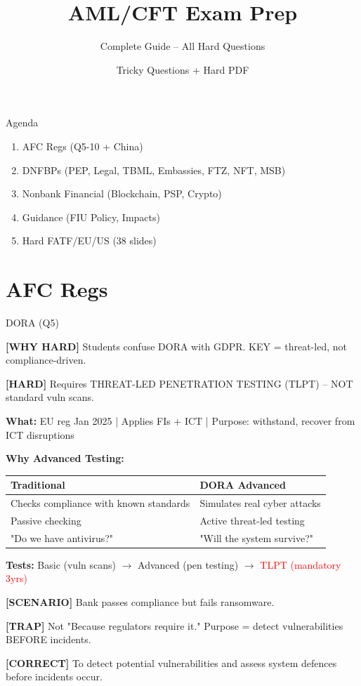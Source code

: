 \documentclass[6pt,aspectratio=169,fontsize=5pt]{beamer}
\renewcommand{\tiny}{\fontsize{3.5pt}{4.5pt}\selectfont}
\renewcommand{\footnotesize}{\fontsize{5.5pt}{6.5pt}\selectfont}
\renewcommand{\normalsize}{\fontsize{7.5pt}{8.5pt}\selectfont}
\renewcommand{\large}{\fontsize{8.5pt}{10pt}\selectfont}
\renewcommand{\LARGE}{\fontsize{12pt}{14pt}\selectfont}
\newcommand{\trap}[1]{%
	\begin{block}{\textcolor{redtrap}{\textbf{[TRAP]}}}
		\textcolor{redtrap}{\tiny #1}
	\end{block}
}
\newcommand{\scenario}[1]{%
	\begin{block}{\textbf{[SCENARIO]}}
		\tiny #1
	\end{block}
}
\newcommand{\correct}[1]{%
	\begin{block}{\textcolor{greencorrect}{\textbf{[CORRECT]}}}
		\textcolor{greencorrect}{\tiny #1}
	\end{block}
}
\newcommand{\hard}[1]{%
	\begin{block}{\textcolor{hardcolor}{\textbf{[HARD]}}}
		\textcolor{hardcolor}{\tiny #1}
	\end{block}
}
\newcommand{\hardexplain}[1]{%
	\begin{block}{\textcolor{orangehard}{\textbf{[WHY HARD]}}}
		\textcolor{orangehard}{\tiny #1}
	\end{block}
}
\begin{document}
	
	\begin{frame}
		\title{\LARGE AML/CFT Exam Prep}
		\subtitle{\large Complete Guide -- All Hard Questions}
		\author{\footnotesize Tricky Questions + Hard PDF}
		\date{}
		\titlepage
	\end{frame}
	
	\begin{frame}{\large Agenda}
		\begin{enumerate}
			\item AFC Regs (Q5-10 + China)
			\item DNFBPs (PEP, Legal, TBML, Embassies, FTZ, NFT, MSB)
			\item Nonbank Financial (Blockchain, PSP, Crypto)
			\item Guidance (FIU Policy, Impacts)
			\item Hard FATF/EU/US (38 slides)
		\end{enumerate}
	\end{frame}
	
	\section{AFC Regs}
	
	\begin{frame}{\normalsize DORA (Q5)}
		
		\hardexplain{Students confuse DORA with GDPR. KEY = threat-led, not compliance-driven.}
		
		\hard{Requires THREAT-LED PENETRATION TESTING (TLPT) -- NOT standard vuln scans.}
		
		\textbf{What:} EU reg Jan 2025 | Applies FIs + ICT | Purpose: withstand, recover from ICT disruptions
		
		\textbf{Why Advanced Testing:}
		\begin{table}
			\begin{tabular}{|p{3.8cm}|p{3.8cm}|}
				\hline
				\textbf{Traditional} & \textbf{DORA Advanced} \\
				\hline
				Checks compliance with known standards & Simulates real cyber attacks \\
				\hline
				Passive checking & Active threat-led testing \\
				\hline
				"Do we have antivirus?" & "Will the system survive?" \\
				\hline
			\end{tabular}
		\end{table}
		
		\textbf{Tests:} Basic (vuln scans) $\to$ Advanced (pen testing) $\to$ \textcolor{red}{TLPT (mandatory 3yrs)}
		
		\scenario{Bank passes compliance but fails ransomware.}
		
		\trap{Not "Because regulators require it." Purpose = detect vulnerabilities BEFORE incidents.}
		
		\correct{To detect potential vulnerabilities and assess system defences before incidents occur.}
	\end{frame}
	
\end{document}
